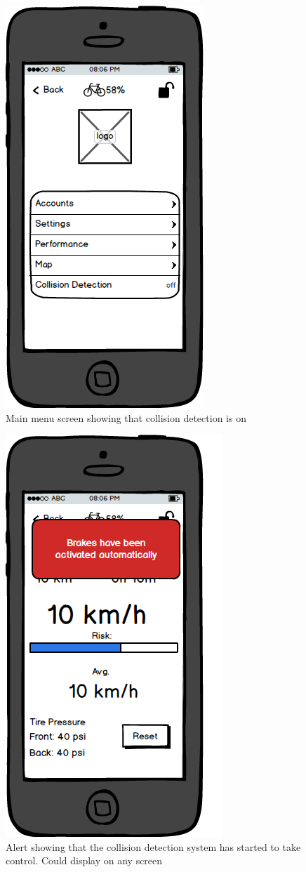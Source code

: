 \documentclass[a4paper]{report}
\begin{document}
\clearpage
\begin{figure}
\centering
\includegraphics[scale=0.9]{figures/prototype_2/main_collision}
\caption{Main menu screen showing that collision detection is on}
\end{figure}
\clearpage
\begin{figure}
\centering
\includegraphics[scale=0.8]{figures/prototype_2/performance_control_alert}
\caption{Alert showing that the collision detection system has started to take control. Could display on any screen}
\end{figure}
\end{document}
